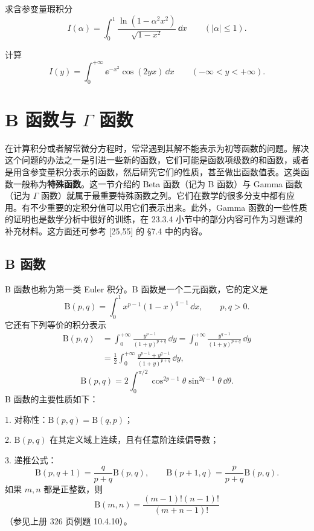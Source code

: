 \begin{xexercise}[10]
求含参变量瑕积分
  \[
    I(\alpha)=\int_0^1\frac{\ln(1-\alpha^2x^2)}{\sqrt{1-x^2}}\,\dd x\qquad(|\alpha|\leqslant1).
  \]
\end{xexercise}

\begin{xexercise}[11]
计算
  \[
    I(y)=\int_0^{+\infty}\ee^{-x^2}\cos(2yx)\,\dd x\qquad(-\infty<y<+\infty).
  \]
\end{xexercise}

\section{\texorpdfstring{B 函数与 $\Gamma$ 函数}{B 函数与 Gamma 函数}}

在计算积分或者解常微分方程时，常常遇到其解不能表示为初等函数的问题。解决这个问题的办法之一是引进一些新的函数，它们可能是函数项级数的和函数，或者是用含参变量积分表示的函数，然后研究它们的性质，甚至做出函数值表。这类函数一般称为\textbf{特殊函数}。这一节介绍的 Beta 函数（记为 B 函数）与 Gamma 函数（记为 $\Gamma$ 函数）就属于最重要特殊函数之列。它们在数学的很多分支中都有应用。有不少重要的定积分值可以用它们表示出来。此外，Gamma 函数的一些性质的证明也是数学分析中很好的训练，在 23.3.4 小节中的部分内容可作为习题课的补充材料。这方面还可参考 [25,55] 的 §7.4 中的内容。

\subsection{B 函数}
B 函数也称为第一类 Euler 积分。B 函数是一个二元函数，它的定义是
\begin{equation}
  \mathrm{B}(p,q)=\int_0^1x^{p-1}(1-x)^{q-1}\,\dd x,\qquad p,q>0.
  \tag{23.9}
\end{equation}
它还有下列等价的积分表示
\[
\begin{aligned}
  \mathrm{B}(p,q)&=\int_0^{+\infty}\frac{y^{p-1}}{(1+y)^{p+q}}\,\dd y
  =\int_0^{+\infty}\frac{y^{q-1}}{(1+y)^{p+q}}\,\dd y\\
  &=\frac12\int_0^{+\infty}\frac{y^{p-1}+y^{q-1}}{(1+y)^{p+q}}\,\dd y,
\end{aligned}
\]
\[
  \mathrm{B}(p,q)=2\int_0^{\pi/2}\cos^{2p-1}\theta\sin^{2q-1}\theta\,\dd\theta.
\]
B 函数的主要性质如下：

1. 对称性：$\mathrm{B}(p,q)=\mathrm{B}(q,p)$；

2. $\mathrm{B}(p,q)$ 在其定义域上连续，且有任意阶连续偏导数；

3. 递推公式：
\[
  \mathrm{B}(p,q+1)=\frac{q}{p+q}\mathrm{B}(p,q),\qquad
  \mathrm{B}(p+1,q)=\frac{p}{p+q}\mathrm{B}(p,q).
\]
如果 $m,n$ 都是正整数，则
\[
  \mathrm{B}(m,n)=\frac{(m-1)!(n-1)!}{(m+n-1)!}
\]
（参见上册 326 页例题 10.4.10）。

